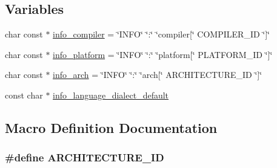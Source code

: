 \subsection*{Variables}
\begin{DoxyCompactItemize}
\item 
char const $\ast$ \hyperlink{a00014_a4b0efeb7a5d59313986b3a0390f050f6_a4b0efeb7a5d59313986b3a0390f050f6}{info\+\_\+compiler} = \char`\"{}I\+N\+FO\char`\"{} \char`\"{}\+:\char`\"{} \char`\"{}compiler\mbox{[}\char`\"{} C\+O\+M\+P\+I\+L\+E\+R\+\_\+\+ID \char`\"{}\mbox{]}\char`\"{}
\item 
char const $\ast$ \hyperlink{a00014_a2321403dee54ee23f0c2fa849c60f7d4_a2321403dee54ee23f0c2fa849c60f7d4}{info\+\_\+platform} = \char`\"{}I\+N\+FO\char`\"{} \char`\"{}\+:\char`\"{} \char`\"{}platform\mbox{[}\char`\"{} P\+L\+A\+T\+F\+O\+R\+M\+\_\+\+ID \char`\"{}\mbox{]}\char`\"{}
\item 
char const $\ast$ \hyperlink{a00014_a59647e99d304ed33b15cb284c27ed391_a59647e99d304ed33b15cb284c27ed391}{info\+\_\+arch} = \char`\"{}I\+N\+FO\char`\"{} \char`\"{}\+:\char`\"{} \char`\"{}arch\mbox{[}\char`\"{} A\+R\+C\+H\+I\+T\+E\+C\+T\+U\+R\+E\+\_\+\+ID \char`\"{}\mbox{]}\char`\"{}
\item 
const char $\ast$ \hyperlink{a00014_a1ce162bad2fe6966ac8b33cc19e120b8_a1ce162bad2fe6966ac8b33cc19e120b8}{info\+\_\+language\+\_\+dialect\+\_\+default}
\end{DoxyCompactItemize}


\subsection{Macro Definition Documentation}
\subsubsection[{\texorpdfstring{A\+R\+C\+H\+I\+T\+E\+C\+T\+U\+R\+E\+\_\+\+ID}{ARCHITECTURE_ID}}]{\setlength{\rightskip}{0pt plus 5cm}\#define A\+R\+C\+H\+I\+T\+E\+C\+T\+U\+R\+E\+\_\+\+ID}\hypertarget{a00014_aba35d0d200deaeb06aee95ca297acb28_aba35d0d200deaeb06aee95ca297acb28}{}\label{a00014_aba35d0d200deaeb06aee95ca297acb28_aba35d0d200deaeb06aee95ca297acb28}
